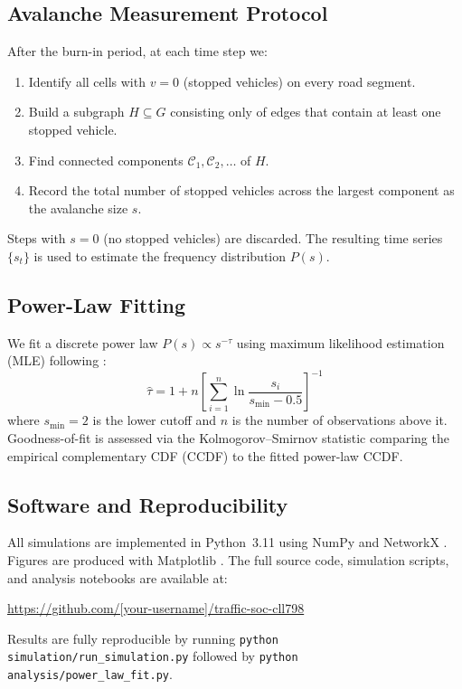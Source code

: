 \documentclass[12pt,a4paper]{article}
\begin{document}
\subsection{Avalanche Measurement Protocol}
\label{subsec:avl_meas}

After the burn-in period, at each time step we:
\begin{enumerate}
  \item Identify all cells with $v = 0$ (stopped vehicles) 
        on every road segment.
  \item Build a subgraph $H \subseteq G$ consisting only of 
        edges that contain at least one stopped vehicle.
  \item Find connected components $\mathcal{C}_1, \mathcal{C}_2, \ldots$ 
        of $H$.
  \item Record the total number of stopped vehicles across the 
        largest component as the avalanche size $s$.
\end{enumerate}

Steps with $s = 0$ (no stopped vehicles) are discarded. The 
resulting time series $\{s_t\}$ is used to estimate the frequency 
distribution $P(s)$.

\subsection{Power-Law Fitting}
\label{subsec:fitting}

We fit a discrete power law $P(s) \propto s^{-\tau}$ using 
maximum likelihood estimation (MLE) following \citet{clauset2009}:
\begin{equation}
  \hat{\tau} = 1 + n \left[\sum_{i=1}^{n} 
  \ln\frac{s_i}{s_\text{min} - 0.5}\right]^{-1}
  \label{eq:mle}
\end{equation}
where $s_\text{min} = 2$ is the lower cutoff and $n$ is the number 
of observations above it. Goodness-of-fit is assessed via the 
Kolmogorov–Smirnov statistic comparing the empirical complementary 
CDF (CCDF) to the fitted power-law CCDF.

\subsection{Software and Reproducibility}
\label{subsec:software}

All simulations are implemented in Python~3.11 using NumPy 
\citep{numpy} and NetworkX \citep{networkx}. Figures are produced 
with Matplotlib \citep{matplotlib}. The full source code, 
simulation scripts, and analysis notebooks are available at:
\begin{center}
  \url{https://github.com/[your-username]/traffic-soc-cll798}
\end{center}
Results are fully reproducible by running 
\texttt{python simulation/run\_simulation.py} followed by 
\texttt{python analysis/power\_law\_fit.py}.
\end{document}
